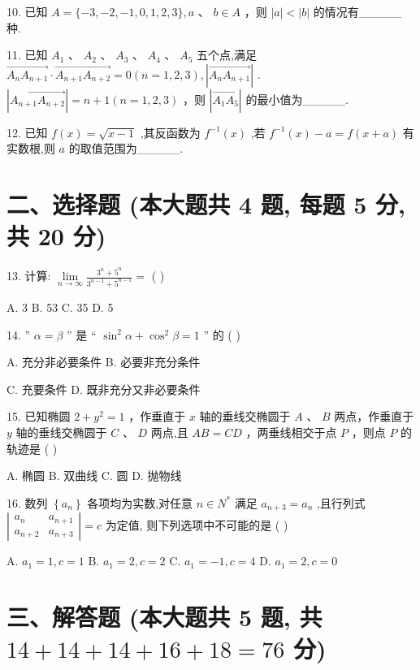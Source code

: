\documentclass[10pt]{article}
\begin{document}
10. 已知 \(A = \{  - 3, - 2, - 1,0,1,2,3\} ,a\text{ 、 }b \in  A\) ，则 \(\left| a\right|  < \left| b\right|\) 的情况有\_\_\_\_\_种.

11. 已知 \({A}_{1}\text{ 、 }{A}_{2}\text{ 、 }{A}_{3}\text{ 、 }{A}_{4}\text{ 、 }{A}_{5}\) 五个点,满足 \(\overrightarrow{{A}_{n}{A}_{n + 1}} \cdot  \overrightarrow{{A}_{n + 1}{A}_{n + 2}} = 0\left( {n = 1,2,3}\right) ,\left| \overrightarrow{{A}_{n}{A}_{n + 1}}\right|\) . \(\left| \overrightarrow{{A}_{n + 1}{A}_{n + 2}}\right|  = n + 1\left( {n = 1,2,3}\right)\) ，则 \(\left| \overrightarrow{{A}_{1}{A}_{5}}\right|\) 的最小值为\_\_\_\_\_.

12. 已知 \(f\left( x\right)  = \sqrt{x - 1}\) ,其反函数为 \({f}^{-1}\left( x\right)\) ,若 \({f}^{-1}\left( x\right)  - a = f\left( {x + a}\right)\) 有实数根,则 \(a\) 的取值范围为\_\_\_\_\_.

\section*{二、选择题 (本大题共 4 题, 每题 5 分, 共 20 分)}

13. 计算: \(\mathop{\lim }\limits_{{n \rightarrow  \infty }}\frac{{3}^{n} + {5}^{n}}{{3}^{n - 1} + {5}^{n - 1}} =\) (   )

A. 3 B. 53 C. 35 D. 5

14. ” \(\alpha  = \beta\) ” 是 “ \({\sin }^{2}\alpha  + {\cos }^{2}\beta  = 1\) ” 的 ( )

A. 充分非必要条件 B. 必要非充分条件

C. 充要条件 D. 既非充分又非必要条件

15. 已知椭圆 \(2 + {y}^{2} = 1\) ，作垂直于 \(x\) 轴的垂线交椭圆于 \(A\) 、 \(B\) 两点，作垂直于 \(y\) 轴的垂线交椭圆于 \(C\) 、 \(D\) 两点,且 \({AB} = {CD}\) ，两垂线相交于点 \(P\) ，则点 \(P\) 的轨迹是 ( )

A. 椭圆 B. 双曲线 C. 圆 D. 抛物线

16. 数列 \(\left\{  {a}_{n}\right\}\) 各项均为实数,对任意 \(n \in  {N}^{ * }\) 满足 \({a}_{n + 3} = {a}_{n}\) ,且行列式 \(\left| \begin{matrix} {a}_{n} & {a}_{n + 1} \\  {a}_{n + 2} & {a}_{n + 3} \end{matrix}\right|  = c\) 为定值, 则下列选项中不可能的是 ( )

A. \({a}_{1} = 1,c = 1\) B. \({a}_{1} = 2,c = 2\) C. \({a}_{1} =  - 1,c = 4\) D. \({a}_{1} = 2,c = 0\)

\section*{三、解答题 (本大题共 5 题, 共 \({14} + {14} + {14} + {16} + {18} = {76}\) 分)}
\end{document}
